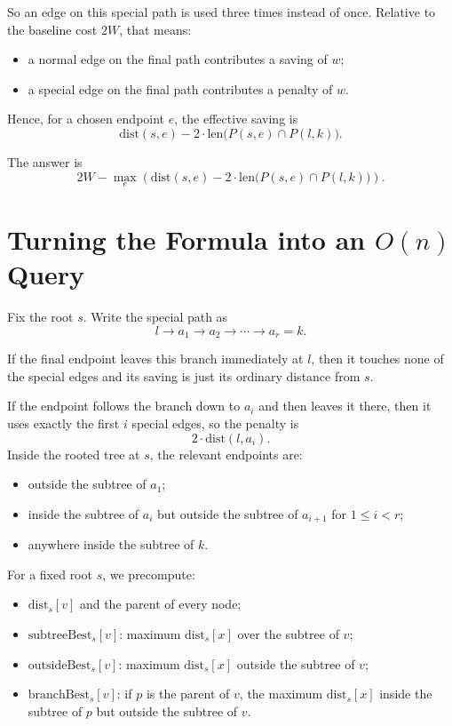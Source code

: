 \documentclass[11pt]{article}
\begin{document}
So an edge on this special path is used three times instead of once. Relative to the baseline cost $2W$,
that means:
\begin{itemize}[leftmargin=*]
    \item a normal edge on the final path contributes a saving of $w$;
    \item a special edge on the final path contributes a penalty of $w$.
\end{itemize}

Hence, for a chosen endpoint $e$, the effective saving is
\[
    \mathrm{dist}(s,e) - 2 \cdot \mathrm{len}\bigl(P(s,e) \cap P(l,k)\bigr).
\]

The answer is
\[
    2W - \max_e
    \left(
        \mathrm{dist}(s,e) - 2 \cdot \mathrm{len}\bigl(P(s,e) \cap P(l,k)\bigr)
    \right).
\]

\section*{Turning the Formula into an $O(n)$ Query}

Fix the root $s$. Write the special path as
\[
    l \to a_1 \to a_2 \to \cdots \to a_r = k.
\]

If the final endpoint leaves this branch immediately at $l$, then it touches none of the special edges and
its saving is just its ordinary distance from $s$.

If the endpoint follows the branch down to $a_i$ and then leaves it there, then it uses exactly the first
$i$ special edges, so the penalty is
\[
    2 \cdot \mathrm{dist}(l, a_i).
\]
Inside the rooted tree at $s$, the relevant endpoints are:
\begin{itemize}[leftmargin=*]
    \item outside the subtree of $a_1$;
    \item inside the subtree of $a_i$ but outside the subtree of $a_{i+1}$ for $1 \le i < r$;
    \item anywhere inside the subtree of $k$.
\end{itemize}

For a fixed root $s$, we precompute:
\begin{itemize}[leftmargin=*]
    \item $\text{dist}_s[v]$ and the parent of every node;
    \item $\text{subtreeBest}_s[v]$: maximum $\text{dist}_s[x]$ over the subtree of $v$;
    \item $\text{outsideBest}_s[v]$: maximum $\text{dist}_s[x]$ outside the subtree of $v$;
    \item $\text{branchBest}_s[v]$: if $p$ is the parent of $v$, the maximum $\text{dist}_s[x]$ inside the
    subtree of $p$ but outside the subtree of $v$.
\end{itemize}
\end{document}
